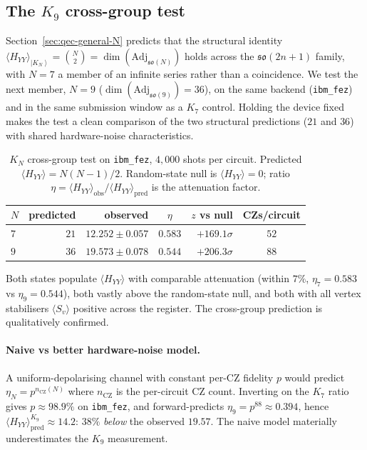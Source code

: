 \documentclass[11pt]{article}
\newcommand{\so}{\mathfrak{so}}
\newcommand{\Adj}{\mathrm{Adj}}
\newcommand{\ket}[1]{\left|#1\right\rangle}
\begin{document}
\subsection{The $K_9$ cross-group test}
\label{sec:heron-k9}

Section~\ref{sec:qec-general-N} predicts that the structural
identity $\langle H_{YY}\rangle_{\ket{K_N}} = \binom{N}{2} =
\dim(\Adj_{\so(N)})$ holds across the $\so(2n+1)$ family, with
$N = 7$ a member of an infinite series rather than a coincidence.
We test the next member, $N = 9$ ($\dim(\Adj_{\so(9)}) = 36$),
on the same backend (\texttt{ibm\_fez}) and in the same submission
window as a $K_7$ control.  Holding the device fixed makes the
test a clean comparison of the two structural predictions
($21$ and $36$) with shared hardware-noise characteristics.

\begin{table}[H]
\centering
\caption{$K_N$ cross-group test on \texttt{ibm\_fez}, $4{,}000$
shots per circuit.  Predicted $\langle H_{YY}\rangle = N(N-1)/2$.
Random-state null is $\langle H_{YY}\rangle = 0$; ratio
$\eta = \langle H_{YY}\rangle_{\text{obs}}/\langle H_{YY}\rangle_{\text{pred}}$
is the attenuation factor.}
\label{tab:heron-KN}
\begin{tabular}{lrrcrc}
\toprule
$N$ & predicted & observed & $\eta$ & $z$ vs null & CZs/circuit \\
\midrule
$7$ & $21$ & $12.252 \pm 0.057$ & $0.583$ & $+169.1\sigma$ & $52$ \\
$9$ & $36$ & $19.573 \pm 0.078$ & $0.544$ & $+206.3\sigma$ & $88$ \\
\bottomrule
\end{tabular}
\end{table}

Both states populate $\langle H_{YY}\rangle$ with comparable
attenuation (within $7\%$, $\eta_7 = 0.583$ vs $\eta_9 = 0.544$),
both vastly above the random-state null, and both with all vertex
stabilisers $\langle S_v\rangle$ positive across the register.
The cross-group prediction is qualitatively confirmed.

\paragraph{Naive vs better hardware-noise model.}
A uniform-depolarising channel with constant per-CZ fidelity $p$
would predict $\eta_N = p^{n_{\text{CZ}}(N)}$ where
$n_{\text{CZ}}$ is the per-circuit CZ count.  Inverting on the
$K_7$ ratio gives $p \approx 98.9\%$ on \texttt{ibm\_fez}, and
forward-predicts $\eta_9 = p^{88} \approx 0.394$, hence
$\langle H_{YY}\rangle_{\text{pred}}^{K_9} \approx 14.2$:
$38\%$ \emph{below} the observed $19.57$.  The naive model
materially underestimates the $K_9$ measurement.
\end{document}
